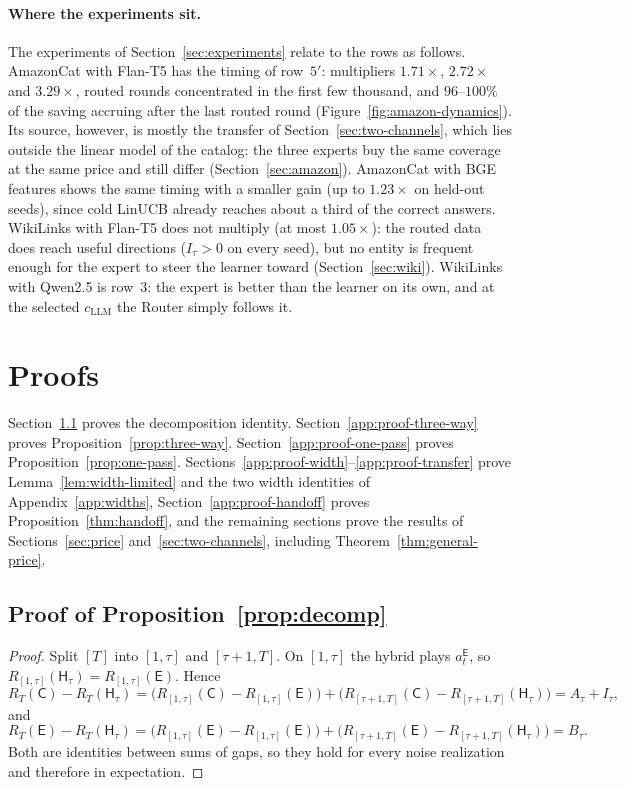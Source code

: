 \documentclass[anon]{alt2027} %
\newcommand{\Cold}{\mathsf{C}}
\newcommand{\Exp}{\mathsf{E}}
\newcommand{\Hyb}{\mathsf{H}}
\begin{document}
\paragraph{Where the experiments sit.}
The experiments of Section~\ref{sec:experiments} relate to the rows as
follows. AmazonCat with Flan-T5 has the timing of row~$5'$: multipliers
$1.71\times$, $2.72\times$ and $3.29\times$, routed rounds concentrated in the
first few thousand, and $96$--$100\%$ of the saving accruing after the last
routed round (Figure~\ref{fig:amazon-dynamics}). Its source, however, is
mostly the transfer of Section~\ref{sec:two-channels}, which lies outside the
linear model of the catalog: the three experts buy the same coverage at the
same price and still differ (Section~\ref{sec:amazon}). AmazonCat with BGE
features shows the same timing with a smaller gain (up to $1.23\times$ on
held-out seeds), since cold LinUCB already reaches about a third of the
correct answers. WikiLinks with Flan-T5 does not multiply (at most
$1.05\times$): the routed data does reach useful directions ($I_\tau>0$ on
every seed), but no entity is frequent enough for the expert to steer the
learner toward (Section~\ref{sec:wiki}). WikiLinks with Qwen2.5 is row~3: the
expert is better than the learner on its own, and at the selected $c_{\mathrm{LLM}}$
the Router simply follows it.

\section{Proofs}
\label{app:proofs}

Section~\ref{app:proof-decomp} proves the decomposition identity.
Section~\ref{app:proof-three-way} proves
Proposition~\ref{prop:three-way}.
Section~\ref{app:proof-one-pass} proves Proposition~\ref{prop:one-pass}.
Sections~\ref{app:proof-width}--\ref{app:proof-transfer} prove
Lemma~\ref{lem:width-limited} and the two width identities of
Appendix~\ref{app:widths}, Section~\ref{app:proof-handoff} proves
Proposition~\ref{thm:handoff}, and the remaining sections prove the results of
Sections~\ref{sec:price} and~\ref{sec:two-channels}, including
Theorem~\ref{thm:general-price}.

\subsection{Proof of Proposition~\ref{prop:decomp}}
\label{app:proof-decomp}

\begin{proof}
Split $[T]$ into $[1,\tau]$ and $[\tau+1,T]$. On $[1,\tau]$ the hybrid plays
$a_t^{\Exp}$, so $R_{[1,\tau]}(\Hyb_\tau)=R_{[1,\tau]}(\Exp)$. Hence
\[
R_T(\Cold)-R_T(\Hyb_\tau)
=\bigl(R_{[1,\tau]}(\Cold)-R_{[1,\tau]}(\Exp)\bigr)
+\bigl(R_{[\tau+1,T]}(\Cold)-R_{[\tau+1,T]}(\Hyb_\tau)\bigr)
=A_\tau+I_\tau ,
\]
and
\[
R_T(\Exp)-R_T(\Hyb_\tau)
=\bigl(R_{[1,\tau]}(\Exp)-R_{[1,\tau]}(\Exp)\bigr)
+\bigl(R_{[\tau+1,T]}(\Exp)-R_{[\tau+1,T]}(\Hyb_\tau)\bigr)
=B_\tau .
\]
Both are identities between sums of gaps, so they hold for every noise
realization and therefore in expectation.
\end{proof}
\end{document}
